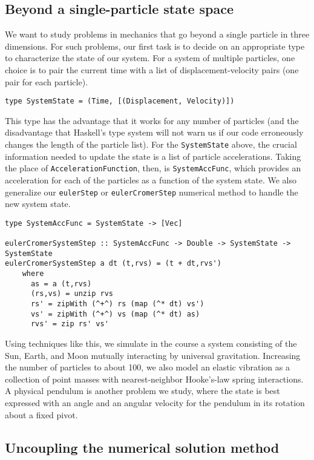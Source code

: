 \documentclass[11pt]{article}
\begin{document}
\subsection{Beyond a single-particle state space}

We want to study problems in mechanics that go beyond
a single particle in three dimensions.
For such problems, our first task is to decide on an appropriate
type to characterize the state of our system.
For a system of multiple particles, one choice is to pair
the current time with a list of displacement-velocity pairs
(one pair for each particle).
\begin{verbatim}
type SystemState = (Time, [(Displacement, Velocity)])
\end{verbatim}
This type has the advantage that it works for any number of particles
(and the disadvantage that Haskell's type system will not warn us
if our code erroneously changes the length of the particle list).
For the \verb|SystemState| above, the crucial information needed
to update the state is a list of particle accelerations.
Taking the place of \verb|AccelerationFunction|, then, is
\verb|SystemAccFunc|, which provides an acceleration for each of
the particles as a function of the system state.
We also generalize our \verb|eulerStep| or \verb|eulerCromerStep| numerical method
to handle the new system state.
\begin{verbatim}
type SystemAccFunc = SystemState -> [Vec]

eulerCromerSystemStep :: SystemAccFunc -> Double -> SystemState -> SystemState
eulerCromerSystemStep a dt (t,rvs) = (t + dt,rvs')
    where
      as = a (t,rvs)
      (rs,vs) = unzip rvs
      rs' = zipWith (^+^) rs (map (^* dt) vs')
      vs' = zipWith (^+^) vs (map (^* dt) as)
      rvs' = zip rs' vs'
\end{verbatim}

Using techniques like this, we simulate in the course
a system consisting of the Sun, Earth, and Moon mutually interacting
by universal gravitation.
Increasing the number of particles to about 100, we also model
an elastic vibration as a collection of point masses with nearest-neighbor
Hooke's-law spring interactions.\cite{giancoliPSE4p318,goldstein12p1}
A physical pendulum is another problem we study, where the state is best
expressed with an angle and an angular velocity for the pendulum in
its rotation about a fixed pivot.

\subsection{Uncoupling the numerical solution method}
\end{document}
